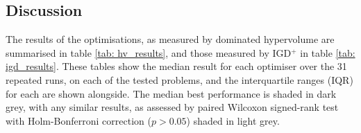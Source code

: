 \documentclass[conference]{IEEEtran}
\newcommand\hpv{dominated hypervolume\xspace}
\newcommand\igd{IGD$^+$\xspace}
\begin{document}

\subsection{Discussion}


The results of the optimisations, as measured by \hpv are summarised in table \ref{tab: hv_results}, and those measured by \igd in table \ref{tab: igd_results}. These tables show the median result for each optimiser over the 31 repeated runs, on each of the tested problems, and the interquartile ranges (IQR) for each are shown alongside. The median best performance is shaded in dark grey, with any similar results, as assessed by paired Wilcoxon signed-rank test \cite{woolson2007wilcoxon} with Holm-Bonferroni correction \cite{holm1979simple} ($p>0.05$) shaded in light grey.
\end{document}
